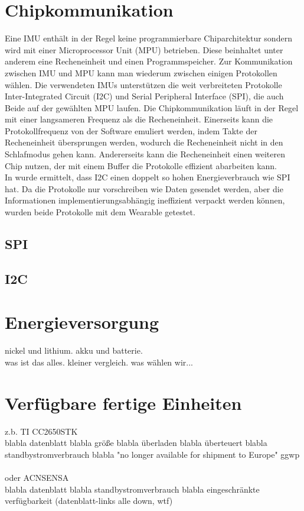 \section{Chipkommunikation}
Eine IMU enthält in der Regel keine programmierbare Chiparchitektur sondern wird mit einer Microprocessor Unit (MPU) betrieben.
Diese beinhaltet unter anderem eine Recheneinheit und einen Programmspeicher.
Zur Kommunikation zwischen IMU und MPU kann man wiederum zwischen einigen Protokollen wählen.
Die verwendeten IMUs unterstützen die weit verbreiteten Protokolle Inter-Integrated Circuit (I2C) und Serial Peripheral Interface (SPI), die auch Beide auf der gewählten MPU laufen.
Die Chipkommunikation läuft in der Regel mit einer langsameren Frequenz als die Recheneinheit.
Einerseits kann die Protokollfrequenz von der Software emuliert werden, indem Takte der Recheneinheit übersprungen werden, wodurch die Recheneinheit nicht in den Schlafmodus gehen kann.
Andererseits kann die Recheneinheit einen weiteren Chip nutzen, der mit einem Buffer die Protokolle effizient abarbeiten kann.
\\
In \cite{comparison_i2c_spi} wurde ermittelt, dass I2C einen doppelt so hohen Energieverbrauch wie SPI hat.
Da die Protokolle nur vorschreiben wie Daten gesendet werden, aber die Informationen implementierungsabhängig ineffizient verpackt werden können, wurden beide Protokolle mit dem Wearable getestet.\\

\subsection{SPI}

\subsection{I2C}

\section{Energieversorgung}
nickel und lithium. akku und batterie.\\
was ist das alles. kleiner vergleich. was wählen wir...

\section{Verfügbare fertige Einheiten}
z.b. TI CC2650STK\\
blabla datenblatt blabla größe blabla überladen blabla überteuert blabla standbystromverbrauch blabla "no longer available for shipment to Europe" ggwp\\
\\
oder ACNSENSA\\
blabla datenblatt blabla standbystromverbrauch blabla eingeschränkte verfügbarkeit (datenblatt-links alle down, wtf)
